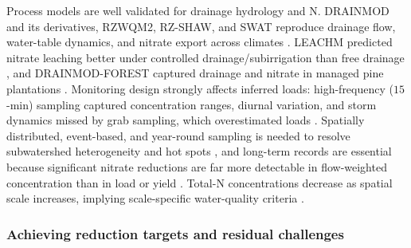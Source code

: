 \documentclass[11pt]{article}
\begin{document}
Process models are well validated for drainage hydrology and N. DRAINMOD
and its derivatives, RZWQM2, RZ-SHAW, and SWAT reproduce drainage flow,
water-table dynamics, and nitrate export across climates
\parencite{Youssef2018,Abdelbaki2025,Craft2018,Jiang2020,Tian2012,Mehan2019}.
LEACHM predicted nitrate leaching better under controlled
drainage/subirrigation than free drainage \parencite{Ng2000}, and
DRAINMOD-FOREST captured drainage and nitrate in managed pine plantations
\parencite{Tian2012}. Monitoring design strongly affects inferred loads:
high-frequency ($15$-min) sampling captured concentration ranges, diurnal
variation, and storm dynamics missed by grab sampling, which overestimated
loads \parencite{Drake2018}. Spatially distributed, event-based, and
year-round sampling is needed to resolve subwatershed heterogeneity and hot
spots \parencite{Irvine2019,Husk2024}, and long-term records are essential
because significant nitrate reductions are far more detectable in
flow-weighted concentration than in load or yield \parencite{Danalatos2022,Ghane2016b}.
Total-N concentrations decrease as spatial scale increases, implying
scale-specific water-quality criteria \parencite{Lagzdins2012}.

\subsubsection{Achieving reduction targets and residual challenges}
\end{document}
